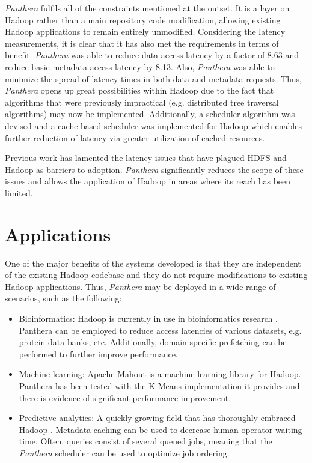 \documentclass[12pt]{article}
\begin{document}
\textit{Panthera} fulfils all of the constraints mentioned at the outset. It is a layer on Hadoop rather than a main repository code modification, allowing existing Hadoop applications to remain entirely unmodified. Considering the latency measurements, it is clear that it has also met the requirements in terms of benefit. \textit{Panthera} was able to reduce data access latency by a factor of 8.63 and reduce basic metadata access latency by 8.13. Also, \textit{Panthera} was able to minimize the spread of latency times in both data and metadata requests. Thus, \textit{Panthera} opens up great possibilities within Hadoop due to the fact that algorithms that were previously impractical (e.g. distributed tree traversal algorithms) may now be implemented. Additionally, a scheduler algorithm was devised and a cache-based scheduler was implemented for Hadoop which enables further reduction of latency via greater utilization of cached resources.

Previous work \cite{hdfs, borthakur2011apache} has lamented the latency issues that have plagued HDFS and Hadoop as barriers to adoption. \textit{Panthera} significantly reduces the scope of these issues and allows the application of Hadoop in areas where its reach has been limited.

\section{Applications}\label{sect:applications}
One of the major benefits of the systems developed is that they are independent of the existing Hadoop codebase and they do not require modifications to existing Hadoop applications. Thus, \textit{Panthera} may be deployed in a wide range of scenarios, such as the following:

\begin{itemize}
	\item Bioinformatics: Hadoop is currently in use in bioinformatics research \cite{taylor2010overview}. Panthera can be employed to reduce access latencies of various datasets, e.g. protein data banks, etc. Additionally, domain-specific prefetching can be performed to further improve performance.
	
	\item Machine learning: Apache Mahout is a machine learning library for Hadoop. Panthera has been tested with the K-Means implementation it provides and there is evidence of significant performance improvement.
	
	\item Predictive analytics: A quickly growing field that has thoroughly
	embraced Hadoop \cite{chen2012business}. Metadata caching can be used to decrease human operator waiting time. Often, queries consist of several queued jobs, meaning that the \textit{Panthera} scheduler can be used to optimize
	job ordering.
\end{itemize}
\end{document}
